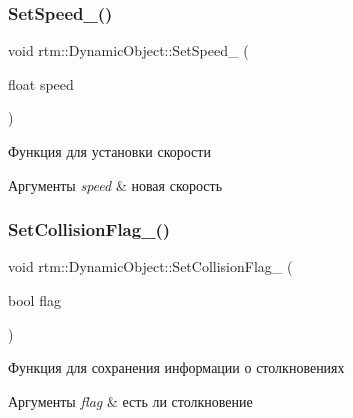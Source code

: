 \subsubsection{\texorpdfstring{Set\+Speed\+\_\+()}{SetSpeed\_()}}
{\footnotesize\ttfamily void rtm\+::\+Dynamic\+Object\+::\+Set\+Speed\+\_\+ (\begin{DoxyParamCaption}\item[{float}]{speed }\end{DoxyParamCaption})\hspace{0.3cm}{\ttfamily [protected]}}



Функция для установки скорости 


\begin{DoxyParams}{Аргументы}
{\em speed} & новая скорость \\
\hline
\end{DoxyParams}
\mbox{\label{classrtm_1_1_dynamic_object_a50d64daac674d1e9f55ce1fb73cf9d6a}} 
\subsubsection{\texorpdfstring{Set\+Collision\+Flag\+\_\+()}{SetCollisionFlag\_()}}
{\footnotesize\ttfamily void rtm\+::\+Dynamic\+Object\+::\+Set\+Collision\+Flag\+\_\+ (\begin{DoxyParamCaption}\item[{bool}]{flag }\end{DoxyParamCaption})\hspace{0.3cm}{\ttfamily [protected]}}



Функция для сохранения информации о столкновениях 


\begin{DoxyParams}{Аргументы}
{\em flag} & есть ли столкновение \\
\hline
\end{DoxyParams}
\mbox{\label{classrtm_1_1_dynamic_object_a8ed34444a34b29ff9a672839c6593558}} 
